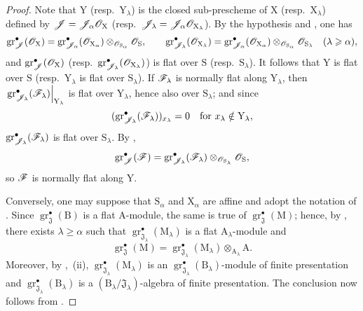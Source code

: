 \begin{proof}
Note that $\mathrm{Y}$ (resp.\ $\mathrm{Y}_\lambda$) is the closed sub-prescheme of $\mathrm{X}$ (resp.\ $\mathrm{X}_\lambda$) defined by $\mathscr{J}=\mathscr{J}_\alpha\mathscr{O}_\mathrm{X}$ (resp.\ $\mathscr{J}_\lambda=\mathscr{J}_\alpha\mathscr{O}_{\mathrm{X}_\lambda}$). By the hypothesis and , one has
\[
\operatorname{gr}^\bullet_\mathscr{J}(\mathscr{O}_\mathrm{X})
=\operatorname{gr}^\bullet_{\mathscr{J}_\alpha}(\mathscr{O}_{\mathrm{X}_\alpha})
 \otimes_{\mathscr{O}_{\mathrm{S}_\alpha}}\mathscr{O}_\mathrm{S},
\qquad
\operatorname{gr}^\bullet_{\mathscr{J}_\lambda}(\mathscr{O}_{\mathrm{X}_\lambda})
=\operatorname{gr}^\bullet_{\mathscr{J}_\alpha}(\mathscr{O}_{\mathrm{X}_\alpha})
 \otimes_{\mathscr{O}_{\mathrm{S}_\alpha}}\mathscr{O}_{\mathrm{S}_\lambda}
\quad(\lambda\geqslant\alpha),
\]
and $\operatorname{gr}^\bullet_\mathscr{J}(\mathscr{O}_\mathrm{X})$ (resp.\ $\operatorname{gr}^\bullet_{\mathscr{J}_\lambda}(\mathscr{O}_{\mathrm{X}_\lambda})$) is flat over $\mathrm{S}$ (resp.\ $\mathrm{S}_\lambda$). It follows that $\mathrm{Y}$ is flat over $\mathrm{S}$ (resp.\ $\mathrm{Y}_\lambda$ is flat over $\mathrm{S}_\lambda$). If $\mathscr{F}_\lambda$ is normally flat along $\mathrm{Y}_\lambda$, then $\left.\operatorname{gr}^\bullet_{\mathscr{J}_\lambda}(\mathscr{F}_\lambda)\right|_{\mathrm{Y}_\lambda}$ is flat over $\mathrm{Y}_\lambda$, hence also over $\mathrm{S}_\lambda$; and since
\[
(\operatorname{gr}^\bullet_{\mathscr{J}_\lambda}(\mathscr{F}_\lambda))_{x_\lambda}=0
\quad\text{for }x_\lambda\notin\mathrm{Y}_\lambda,
\]
$\operatorname{gr}^\bullet_{\mathscr{J}_\lambda}(\mathscr{F}_\lambda)$ is flat over $\mathrm{S}_\lambda$. By ,
\[
\operatorname{gr}^\bullet_\mathscr{J}(\mathscr{F})
=\operatorname{gr}^\bullet_{\mathscr{J}_\lambda}(\mathscr{F}_\lambda)
 \otimes_{\mathscr{O}_{\mathrm{S}_\lambda}}\mathscr{O}_\mathrm{S},
\]
so $\mathscr{F}$ is normally flat along $\mathrm{Y}$.

Conversely, one may suppose that $\mathrm{S}_\alpha$ and $\mathrm{X}_\alpha$ are affine and adopt the notation of . Since $\operatorname{gr}^\bullet_\mathfrak{J}(\mathrm{B})$ is a flat $\mathrm{A}$-module, the same is true of $\operatorname{gr}^\bullet_\mathfrak{J}(\mathrm{M})$; hence, by , there exists $\lambda\geqslant\alpha$ such that $\operatorname{gr}^\bullet_{\mathfrak{J}_\lambda}(\mathrm{M}_\lambda)$ is a flat $\mathrm{A}_\lambda$-module and
\[
\operatorname{gr}^\bullet_\mathfrak{J}(\mathrm{M})
=\operatorname{gr}^\bullet_{\mathfrak{J}_\lambda}(\mathrm{M}_\lambda)
 \otimes_{\mathrm{A}_\lambda}\mathrm{A}.
\]
Moreover, by ,~(ii), $\operatorname{gr}^\bullet_{\mathfrak{J}_\lambda}(\mathrm{M}_\lambda)$ is an $\operatorname{gr}^\bullet_{\mathfrak{J}_\lambda}(\mathrm{B}_\lambda)$-module of finite presentation and $\operatorname{gr}^\bullet_{\mathfrak{J}_\lambda}(\mathrm{B}_\lambda)$ is a $(\mathrm{B}_\lambda/\mathfrak{J}_\lambda)$-algebra of finite presentation. The conclusion now follows from .
\end{proof}


